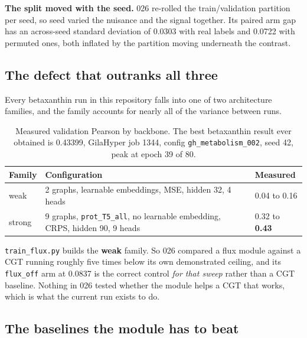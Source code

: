 \textbf{The split moved with the seed.} 026 re-rolled the train/validation partition per
seed, so seed varied the nuisance and the signal together. Its paired arm gap has an
across-seed standard deviation of 0.0303 with real labels and 0.0722 with permuted ones,
both inflated by the partition moving underneath the contrast.

\subsection{The defect that outranks all three}

Every betaxanthin run in this repository falls into one of two architecture families, and
the family accounts for nearly all of the variance between runs.

\begin{table}[H]
  \centering
  \footnotesize
  \caption[The two families]{Measured validation Pearson by backbone. The best betaxanthin
  result ever obtained is 0.43399, GilaHyper job 1344, config \texttt{gh\_metabolism\_002},
  seed 42, peak at epoch 39 of 80.}
  \label{tab:families}
  \begin{tabular}{@{}p{}p{}l@{}}
    \hline
    Family & Configuration & Measured \\
    \hline
    weak & 2 graphs, learnable embeddings, MSE, hidden 32, 4 heads & 0.04 to 0.16 \\
    strong & 9 graphs, \texttt{prot\_T5\_all}, no learnable embedding, CRPS, hidden 90,
      9 heads & 0.32 to \textbf{0.43} \\
    \hline
  \end{tabular}
\end{table}

\texttt{train\_flux.py} builds the \textbf{weak} family. So 026 compared a flux module
against a CGT running roughly five times below its own demonstrated ceiling, and its
\texttt{flux\_off} arm at 0.0837 is the correct control \emph{for that sweep} rather than a
CGT baseline. Nothing in 026 tested whether the module helps a CGT that works, which is
what the current run exists to do.

\subsection{The baselines the module has to beat}

